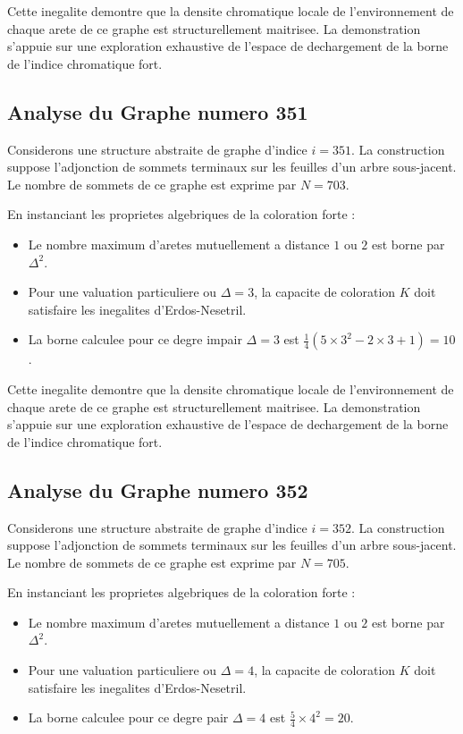 \documentclass[11pt,a4paper]{article}
\begin{document}
Cette inegalite demontre que la densite chromatique locale de l'environnement de chaque arete de ce graphe est structurellement maitrisee. La demonstration s'appuie sur une exploration exhaustive de l'espace de dechargement de la borne de l'indice chromatique fort.

\subsection{Analyse du Graphe numero 351}
Considerons une structure abstraite de graphe d'indice $i = 351$. La construction suppose l'adjonction de sommets terminaux sur les feuilles d'un arbre sous-jacent. Le nombre de sommets de ce graphe est exprime par $N = 703$.

En instanciant les proprietes algebriques de la coloration forte :
\begin{itemize}
\item Le nombre maximum d'aretes mutuellement a distance $1$ ou $2$ est borne par $\Delta^2$.
\item Pour une valuation particuliere ou $\Delta = 3$, la capacite de coloration $K$ doit satisfaire les inegalites d'Erdos-Nesetril.
\item La borne calculee pour ce degre impair $\Delta = 3$ est $\frac{1}{4}(5 \times 3^2 - 2 \times 3 + 1) = 10$.
\end{itemize}

Cette inegalite demontre que la densite chromatique locale de l'environnement de chaque arete de ce graphe est structurellement maitrisee. La demonstration s'appuie sur une exploration exhaustive de l'espace de dechargement de la borne de l'indice chromatique fort.

\subsection{Analyse du Graphe numero 352}
Considerons une structure abstraite de graphe d'indice $i = 352$. La construction suppose l'adjonction de sommets terminaux sur les feuilles d'un arbre sous-jacent. Le nombre de sommets de ce graphe est exprime par $N = 705$.

En instanciant les proprietes algebriques de la coloration forte :
\begin{itemize}
\item Le nombre maximum d'aretes mutuellement a distance $1$ ou $2$ est borne par $\Delta^2$.
\item Pour une valuation particuliere ou $\Delta = 4$, la capacite de coloration $K$ doit satisfaire les inegalites d'Erdos-Nesetril.
\item La borne calculee pour ce degre pair $\Delta = 4$ est $\frac{5}{4} \times 4^2 = 20$.
\end{itemize}
\end{document}
